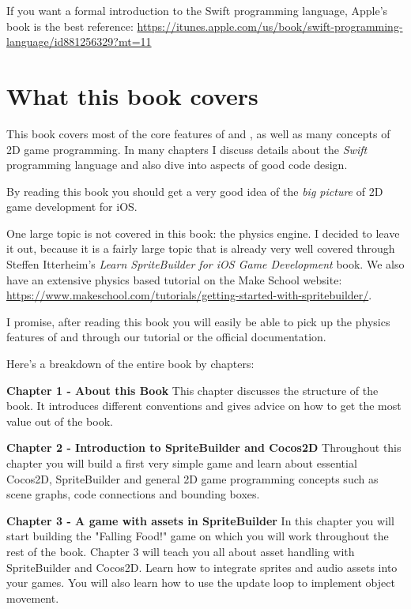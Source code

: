 If you want a formal introduction to the Swift programming language, Apple's
book is the best reference:
\url{https://itunes.apple.com/us/book/swift-programming-language/id881256329?mt=11}

\section{What this book covers}
This book covers most of the core features of \SB{} and \cocos{}, as well as
many concepts of 2D game programming. In many chapters I discuss details about
the \textit{Swift} programming language and also dive into aspects of good code
design. 

By reading this book you should get a very good idea of the \textit{big picture}
of 2D game development for iOS.

One large topic is not covered in this book: the \cocos{} physics engine. I
decided to leave it out, because it is a fairly large topic that is already very
well covered through Steffen Itterheim's \textit{Learn SpriteBuilder for iOS
Game Development} book. We also have an extensive physics based tutorial on the
Make School website:
\url{https://www.makeschool.com/tutorials/getting-started-with-spritebuilder/}.

I promise, after reading this book you will easily be able to pick up the
physics features of \SB{} and \cocos{} through our tutorial or the official
documentation.

Here's a breakdown of the entire book by chapters:

\textbf{Chapter 1 - About this Book}\newline
This chapter discusses the structure of the book. It introduces different conventions and gives advice on how to get the most value out of the book.


\textbf{Chapter 2 - Introduction to SpriteBuilder and Cocos2D}\newline
Throughout this chapter you will build a first very simple game and learn about essential Cocos2D, SpriteBuilder and general 2D game programming concepts such as scene graphs, code connections and bounding boxes.


\textbf{Chapter 3 - A game with assets in SpriteBuilder}\newline
In this chapter you will start building the "Falling Food!" game on which you will work throughout the rest of the book. Chapter 3 will teach you all about asset handling with SpriteBuilder and Cocos2D. Learn how to integrate sprites and audio assets into your games. You will also learn how to use the update loop to implement object movement.


